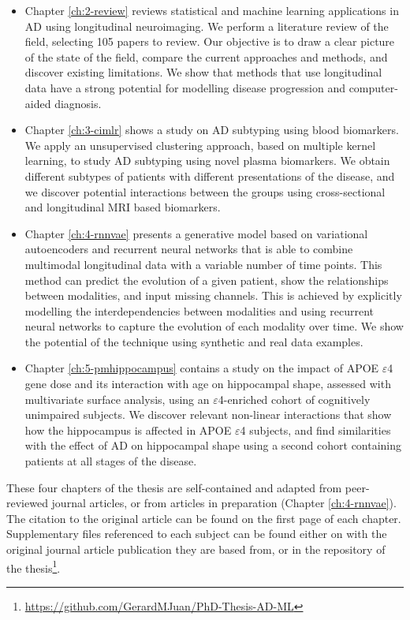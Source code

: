 \begin{itemize}
    \item Chapter \ref{ch:2-review} reviews statistical and machine learning applications in AD using longitudinal neuroimaging. We perform a literature review of the field, selecting 105 papers to review. Our objective is to draw a clear picture of the state of the field, compare the current approaches and methods, and discover existing limitations. We show that methods that use longitudinal data have a strong potential for modelling disease progression and computer-aided diagnosis. 
    \item Chapter \ref{ch:3-cimlr} shows a study on AD subtyping using blood biomarkers. We apply an unsupervised clustering approach, based on multiple kernel learning, to study AD subtyping using novel plasma biomarkers. We obtain different subtypes of patients with different presentations of the disease, and we discover potential interactions between the groups using cross-sectional and longitudinal MRI based biomarkers.
    \item Chapter \ref{ch:4-rnnvae} presents a generative model based on variational autoencoders and recurrent neural networks that is able to combine multimodal longitudinal data with a variable number of time points. This method can predict the evolution of a given patient, show the relationships between modalities, and input missing channels. This is achieved by explicitly modelling the interdependencies between modalities and using recurrent neural networks to capture the evolution of each modality over time. We show the potential of the technique using synthetic and real data examples.
    \item Chapter \ref{ch:5-pmhippocampus} contains a study on the impact of APOE $\varepsilon$4 gene dose and its interaction with age on hippocampal shape, assessed with multivariate surface analysis, using an $\varepsilon$4-enriched cohort of cognitively unimpaired subjects. We discover relevant non-linear interactions that show how the hippocampus is affected in APOE $\varepsilon$4 subjects, and find similarities with the effect of AD on hippocampal shape using a second cohort containing patients at all stages of the disease.
\end{itemize}

These four chapters of the thesis are self-contained and adapted from peer-reviewed journal articles, or from articles in preparation (Chapter \ref{ch:4-rnnvae}). The citation to the original article can be found on the first page of each chapter. Supplementary files referenced to each subject can be found either on with the original journal article publication they are based from, or in the repository of the thesis\footnote{\url{https://github.com/GerardMJuan/PhD-Thesis-AD-ML}}.